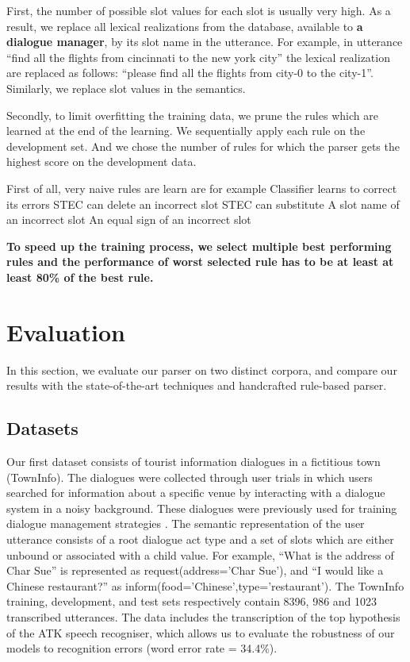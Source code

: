 \documentclass[11pt]{article}
\begin{document}
First, the number of possible slot values for each slot is usually very high. As a result, we replace all lexical realizations from the database, available to \textbf{a dialogue manager}, by its slot name in the utterance. For example, in utterance ``find all the flights from cincinnati to the new york city'' the lexical realization are replaced as follows: ``please find all the flights from city-0 to the city-1''. Similarly, we replace slot values in the semantics.

Secondly, to limit overfitting the training data, we prune the rules which are learned at the end of the learning. We sequentially apply each rule on the development set. And we chose the number of rules for which the parser gets the highest score on the development data.


First of all, very naive rules are learn are for example 
Classifier learns to correct its errors
STEC can delete an incorrect slot
STEC can substitute
A slot name of an incorrect slot
An equal sign of an incorrect slot

\textbf{To speed up the training process, we select multiple best performing rules and the performance of worst selected rule has to be at least at least 80\% of the best rule.}



\section{Evaluation} \label{sec:evaluation}

In this section, we evaluate our parser on two distinct corpora, and compare our results with the state-of-the-art techniques and handcrafted rule-based parser. 

\subsection{Datasets}

Our first dataset consists of tourist information dialogues in a fictitious
town (TownInfo). The dialogues were collected through user
trials in which users searched for information about a specific venue
by interacting with a dialogue system in a noisy background. These
dialogues were previously used for training dialogue management
strategies \cite{williams07,thomson08}. The semantic representation of the user utterance consists of a root dialogue act type and a set of slots which are either
unbound or associated with a child value. For example, ``What is
the address of Char Sue'' is represented as request(address='Char Sue'), and ``I would like a Chinese restaurant?'' as inform(food='Chinese',type='restaurant'). The TownInfo training, development, and test sets respectively contain
8396, 986 and 1023 transcribed utterances.  The data includes the transcription of the top hypothesis of the ATK speech recogniser,
which allows us to evaluate the robustness of our models to recognition
errors (word error rate = 34.4\%). 
\end{document}
